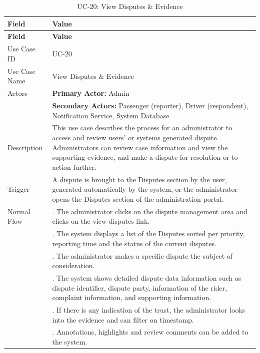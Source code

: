 \begin{longtable}{|>{\raggedright\arraybackslash}p{4cm}|>{\raggedright\arraybackslash}p{11cm}|}
\caption{UC-20: View Disputes \& Evidence}
\label{tab:uc-20} \\
\hline
\rowcolor{lightgray!30}
\textbf{Field} & \textbf{Value} \\
\hline
\endfirsthead
\hline
\rowcolor{lightgray!30}
\textbf{Field} & \textbf{Value} \\
\hline
\endhead
\hline
\endfoot
\hline
\endlastfoot
Use Case ID & UC-20 \\
\hline
Use Case Name & View Disputes \& Evidence \\
\hline
Actors & \textbf{Primary Actor:} Admin \\
& \textbf{Secondary Actors:} Passenger (reporter), Driver (respondent), Notification Service, System Database \\
\hline
Description & This use case describes the process for an administrator to access and review users' or systems generated dispute. Administrators can review case information and view the supporting evidence, and make a dispute for resolution or to action further. \\
\hline
Trigger & A dispute is brought to the Disputes section by the user, generated automatically by the system, or the administrator opens the Disputes section of the administration portal. \\
\hline
Normal Flow & 1. The administrator clicks on the dispute management area and clicks on the view disputes link. \\
& 2. The system displays a list of the Disputes sorted per priority, reporting time and the status of the current disputes. \\
& 3. The administrator makes a specific dispute the subject of consideration. \\
& 4. The system shows detailed dispute data information such as dispute identifier, dispute party, information of the rider, complaint information, and supporting information. \\
& 5. If there is any indication of the trust, the administrator looks into the evidence and can filter on timestamp. \\
& 6. Annotations, highlights and review comments can be added to the system. \\

\end{longtable}
